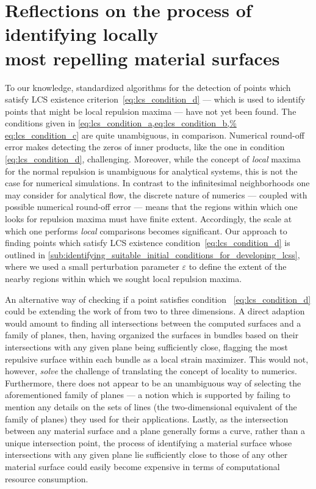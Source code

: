 \section[Reflections on the process of identifying locally most
repelling material surfaces]
{Reflections on the process of identifying locally \\\phantom{5.3} most
repelling material surfaces}
\label{sec:reflections_on_the_process_of_identifying_locally_most_normally%
_repelling_material_surfaces}

To our knowledge, standardized algorithms for the detection of points which
satisfy LCS existence criterion~\eqref{eq:lcs_condition_d} --- which is used to
identify points that might be local repulsion maxima --- have not yet been
found. The conditions given in \cref{eq:lcs_condition_a,eq:lcs_condition_b,%
eq:lcs_condition_c} are quite unambiguous, in comparison. Numerical round-off
error makes detecting the zeros of inner products, like the one in condition~%
\eqref{eq:lcs_condition_d}, challenging. Moreover, while the concept of
\emph{local} maxima for the normal repulsion is unambiguous for analytical
systems, this is not the case for numerical simulations. In contrast to the
infinitesimal neighborhoods one may consider for analytical flow, the discrete
nature of numerics --- coupled with possible numerical round-off error ---
means that the regions within which one looks for repulsion maxima must have
finite extent. Accordingly, the scale at which one performs \emph{local}
comparisons becomes significant. Our approach to finding points which satisfy
LCS existence condition~\eqref{eq:lcs_condition_d} is outlined in
\cref{sub:identifying_suitable_initial_conditions_for_developing_lcss}, where
we used a small perturbation parameter $\varepsilon$ to define the extent of the
nearby regions within which we sought local repulsion maxima.

An alternative way of checking if a point satisfies condition~%
\eqref{eq:lcs_condition_d} could be extending the work of
\textcite{farazmand2012computing} from two to three dimensions. A direct
adaption would amount to finding all intersections between the computed
surfaces and a family of planes, then, having organized the surfaces in bundles
based on their intersections with any given plane being sufficiently close,
flagging the most repulsive surface within each bundle as a local strain
maximizer. This would not, however, \emph{solve} the challenge of translating
the concept of locality to numerics. Furthermore, there does not appear to be
an unambiguous way of selecting the aforementioned family of planes --- a
notion which is supported by \citeauthor{farazmand2012computing} failing to
mention any details on the sets of lines (the two-dimensional equivalent of
the family of planes) they used for their applications. Lastly, as the
intersection between any material surface and a plane generally forms a
curve, rather than a unique intersection point, the process of identifying a
material surface whose intersections with any given plane lie sufficiently
close to those of any other material surface could easily become expensive in
terms of computational resource consumption.

